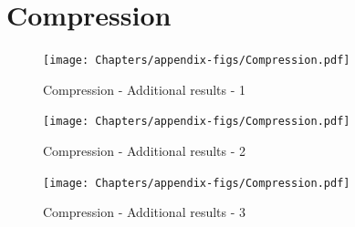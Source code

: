 \section{Compression}
 \begin{figure}[ht]
   \centering
  {\texttt{[image: Chapters/appendix-figs/Compression.pdf]}}
  \caption{Compression - Additional results - 1}
    \label{fig:full-comp}
 \end{figure}
 
\newpage
 \begin{figure}[ht]
   \centering
  {\texttt{[image: Chapters/appendix-figs/Compression.pdf]}}
  \caption{Compression - Additional results - 2}
    \label{fig:full-comp}
 \end{figure}

\newpage
 \begin{figure}[ht]
   \centering
  {\texttt{[image: Chapters/appendix-figs/Compression.pdf]}}
  \caption{Compression - Additional results - 3}
    \label{fig:full-comp}
 \end{figure}

